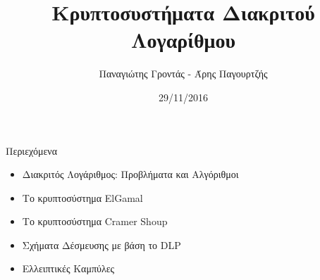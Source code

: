 \documentclass[handout]{beamer}
\title{Κρυπτοσυστήματα Διακριτού Λογαρίθμου}
\author{Παναγιώτης Γροντάς - Άρης Παγουρτζής}
\date{29/11/2016}
\institute{ΕΜΠ - Κρυπτογραφία (2016-2017)}
\begin{document}
\setlength{\columnseprule}{0.4pt}

\newcommand{\xor}{ \oplus }
\newcommand{\MSG}{ \mathtt{M} }
\newcommand{\KEY}{ \mathtt{K} }
\newcommand{\CPH}{ \mathtt{C} }
\newcommand{\keygen}{\mathtt{KeyGen}}
\newcommand{\enc}{\mathtt{Encrypt}}
\newcommand{\dec}{\mathtt{Decrypt}}
\newcommand{\adv}{$\mathcal{A}$ }
\newcommand{\advb}{$\mathcal{B} \,$ }
\newcommand{\chal}{$\mathcal{C} \,$ }
\newcommand{\hash}{$\mathcal{H} \,$ }
\newcommand{\cs}{$\mathcal{CS} \,$ }
\newcommand{\zns}{  \mathbb{Z}^*_n }
\newcommand{\zn}[1]{  \mathbb{Z}^*_#1 }

\newcommand{\green}[1]{\textcolor{teal}{#1}}
\newcommand{\Green}[1]{\textcolor{Teal}{#1}}
\newcommand{\ForestGreen}[1]{\textcolor{ForestGreen}{#1}}
\newcommand{\blue}[1]{\textcolor{blue}{#1}}
\newcommand{\magenta}[1]{\textcolor{magenta}{#1}}
\newcommand{\cyan}[1]{\textcolor{cyan}{#1}}

\newcommand{\twopartdef}[4]
{ 
		\begin{cases}
			#1 , #2 \\
			#3 , #4
		\end{cases} 
}

\npthousandsep{ }
\begin{frame}
\titlepage
\end{frame}



\begin{frame}{Περιεχόμενα}
\begin{itemize}
\item Διακριτός Λογάριθμος: Προβλήματα και Αλγόριθμοι
\pause
\item Το κρυπτοσύστημα ElGamal
\pause 
\item Το κρυπτοσύστημα Cramer Shoup
\pause
\item Σχήματα Δέσμευσης με βάση το DLP
\pause
\item Ελλειπτικές Καμπύλες
\pause
\end{itemize}
\end{frame}
\end{document}
